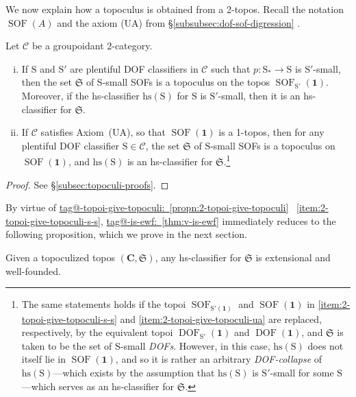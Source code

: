 \documentclass{amsart}
\makeatletter
\newcommand\bC{\mathbf{C}}
\newcommand\cC{\mathcal{C}}
\newcommand\DOF{\operatorname{DOF}}
\newcommand\fS{\mathfrak{S}}
\newcommand\hs{\mathrm{hs}}
\newcommand\rS{\mathrm{S}}
\newcommand\SOF{\operatorname{SOF}}
\newcommand\tm{\mathbf{1}}
\newcommand\tagword[1]{\csname tag@#1\endcsname}
\def\label@tag#1:#2\@nil{#1}
\newcommand\labeltag[1]{\label@tag#1:\@nil}
\newcommand\jref[1]{%
  \texorpdfstring%
    {\hyperref[#1]{\tagword{\labeltag{#1}}~\ref*{#1}}}%
    {\tagword{\labeltag{#1}}~\ref*{#1}}%
}
\newcommand\prerefpost[3]{%
  \texorpdfstring%
    {\hyperref[#2]{#1\ref*{#2}#3}}%
    {#1\ref*{#2}#3}%
}
\newcommand\sref[1]{\prerefpost{\S}{#1}{}}
\theoremstyle{definition}
\theoremstyle{remark}
\theoremstyle{plainwithref}
\makeatother
\begin{document}
We now explain how a topoculus is obtained from a 2-topos.
Recall the notation \( \SOF(A) \) and the axiom (UA) from \sref{subsubsec:dof-sof-digression}.
\begin{propn} \label{propn:2-topoi-give-topoculi}
  Let \( \cC \) be a groupoidant 2-category.
  \begin{enumerate}[(i)]
  \item \label{item:2-topoi-give-topoculi-s-s} If \( \rS \) and \( \rS' \) are plentiful DOF classifiers in \( \cC \) such that \( p \colon \rS_* \to \rS \) is \( \rS' \)-small, then the set \( \fS \) of \( \rS \)-small SOFs is a topoculus on the topos \( \SOF_{\rS'}(\tm) \).
    Moreover, if the hs-classifier \( \hs(\rS) \) for \( \rS \) is \( \rS' \)-small, then it is an hs-classifier for \( \fS \).
  \item \label{item:2-topoi-give-topoculi-ua} If \( \cC \) satisfies Axiom~(UA), so that \( \SOF(\tm) \) is a 1-topos, then for any plentiful DOF classifier \( \rS \in \cC \), the set \( \fS \) of \( \rS \)-small SOFs is a topoculus on \( \SOF(\tm) \), and \( \hs(\rS) \) is an hs-classifier for \( \fS \).\footnote{%
      The same statements holds if the topoi \( \SOF_{\rS'(\tm)} \) and \( \SOF(\tm) \) in \ref{item:2-topoi-give-topoculi-s-s} and \ref{item:2-topoi-give-topoculi-ua} are replaced, respectively, by the equivalent topoi \( \DOF_{\rS'}(\tm) \) and \( \DOF(\tm) \), and \( \fS \) is taken to be the set of \( \rS \)-small \emph{DOFs}.
      However, in this case, \( \hs(\rS) \) does not itself lie in \( \SOF(\tm) \), and so it is rather an arbitrary \emph{DOF-collapse} of \( \hs(\rS) \)---which exists by the assumption that \( \hs(\rS) \) is \( \rS' \)-small for some \( \rS \)---which serves as an hs-classifier for \( \fS \). %
    }
  \end{enumerate}
\end{propn}

\begin{proof}
  See \hyperref[proof:2-topoi-give-topoculi]{\S\ref*{subsec:topoculi-proofs}}.
\end{proof}

By virtue of \jref{propn:2-topoi-give-topoculi}~\ref{item:2-topoi-give-topoculi-s-s}, \jref{thm:v-is-ewf} immediately reduces to the following proposition, which we prove in the next section.
\begin{propn} \label{propn:v-is-ewf-topoculus}
  Given a topoculized topos \( (\bC, \fS) \), any hs-classifier for \( \fS \) is extensional and well-founded.
\end{propn}
\end{document}
